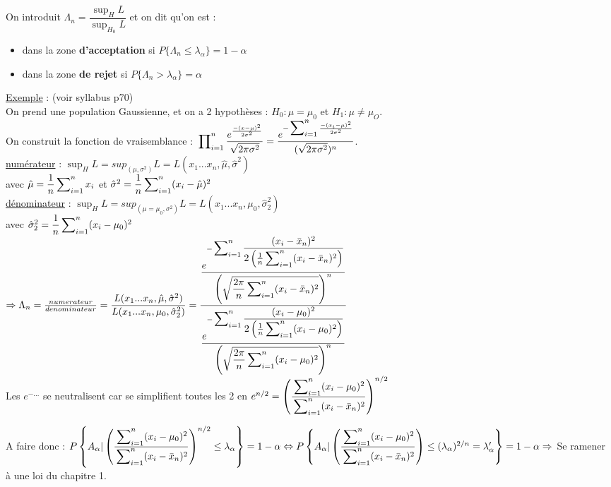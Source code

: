 \documentclass{article}
\newcommand{\mcha}{\hat{\mu}}
\newcommand{\scha}{\hat{\sigma}}
\newcommand{\gau}{\dfrac{e^\frac{-(x-\mu)^2}{2\sigma^2}}{\sqrt{2\pi\sigma^2}}}
\newcommand{\esum}[1]{\dfrac{ e^{-\sideset{}{_{i=1}^n}\sum \frac{-(x_i-#1)^2}{2\sigma^2}}} {(\sqrt{2\pi\sigma^2})^n}}
\newcommand{\sumin}{\sideset{}{_{i=1}^n}\sum}
\newcommand{\prodin}{\sideset{}{_{i=1}^n}\prod}
\begin{document}
On introduit $\Lambda_n = \dfrac{\sup_HL}{\sup_{H_0}L}$ et on dit qu'on est : 
\begin{itemize}
\item dans la zone \textbf{d'acceptation} si $P\{\Lambda_n \leq \lambda_\alpha\} = 1-\alpha$
\item dans la zone \textbf{de rejet} si $P\{\Lambda_n > \lambda_\alpha \} = \alpha$
\end{itemize}

\noindent \underline{Exemple} : (voir syllabus p70) \\
On prend une population Gaussienne, et on a 2 hypothèses : $H_0 : \mu = \mu_0$ et $H_1 : \mu \neq \mu_O$. \\
On construit la fonction de vraisemblance : $\prodin \gau = \esum{\mu}$. \\
\underline{numérateur} : $\sup_HL = sup_{(\mu,\sigma^2)}L = L(x_1...x_n,\mcha,\scha^2)$ \\
\indent avec $\mcha = \dfrac{1}{n}\sumin x_i$ et $\scha^2 = \dfrac{1}{n} \sumin (x_i-\mcha)^2$ \\
\underline{dénominateur} : $\sup_HL = sup_{(\mu=\mu_0,\sigma^2)}L = L(x_1...x_n,\mu_0,\scha^2_2)$ \\
\indent avec $\scha^2_2 = \dfrac{1}{n} \sumin (x_i-\mu_0)^2$ \\

$\Rightarrow \Lambda_n = \frac{numerateur}{denominateur} \\
= \dfrac{L(x_1...x_n,\mcha,\scha^2)}{L(x_1...x_n,\mu_0,\scha^2_2)}
= \dfrac{ \dfrac{e^{-\sumin\dfrac{(x_i-\bar{x}_n)^2}
		{2 \left( \frac{1}{n} \sumin (x_i-\bar{x}_n)^2 \right)  }}}
		{\left(\sqrt{\dfrac{2\pi}{n} \sumin (x_i-\bar{x}_n)^2}\right)^n} }
		{ \dfrac{e^{-\sumin\dfrac{(x_i-\mu_0)^2}
		{2 \left( \frac{1}{n} \sumin (x_i-\mu_0)^2 \right)  }}}
		{\left(\sqrt{\dfrac{2\pi}{n} \sumin (x_i-\mu_0)^2}\right)^n}}
$ \\
Les $e^{-...}$ se neutralisent car se simplifient toutes les 2 en $e^{n/2} \\
= \left(\dfrac{\sumin (x_i-\mu_0)^2}{\sumin (x_i-\bar{x}_n)^2}\right)^{n/2} \\$

A faire donc : $P\left\{ A_\alpha | \left(\dfrac{\sumin (x_i-\mu_0)^2}{\sumin (x_i-\bar{x}_n)^2}\right)^{n/2} 
\leq \lambda_\alpha \right\} = 1-\alpha \\
\Leftrightarrow P\left\{ A_\alpha | \left(\dfrac{\sumin (x_i-\mu_0)^2}{\sumin (x_i-\bar{x}_n)^2}\right) 
\leq (\lambda_\alpha)^{2/n} = \lambda_\alpha' \right\} = 1-\alpha \\
\Rightarrow $ Se ramener à une loi du chapitre 1. \\
\end{document}
